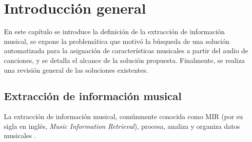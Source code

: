 
\chapter{Introducción general} %

\label{Chapter1} %
\label{IntroGeneral}


En este capítulo se introduce la definición de la extracción de información musical, se expone la problemática que motivó la búsqueda de una solución automatizada para la asignación de características musicales a partir del audio de canciones, y se detalla el alcance de la solución propuesta. Finalmente, se realiza una revisión general de las soluciones existentes.

\newcommand{\keyword}[1]{\textbf{#1}}
\newcommand{\tabhead}[1]{\textbf{#1}}
\newcommand{\code}[1]{\texttt{#1}}
\newcommand{\file}[1]{\texttt{\bfseries#1}}
\newcommand{\option}[1]{\texttt{\itshape#1}}
\newcommand{\grados}{$^{\circ}$}



\section{Extracción de información musical}


La extracción de información musical, comúnmente conocida como MIR (por su sigla en inglés, \textit{Music Information Retrieval}), procesa, analiza y organiza datos musicales \citep{Downie2003}.

